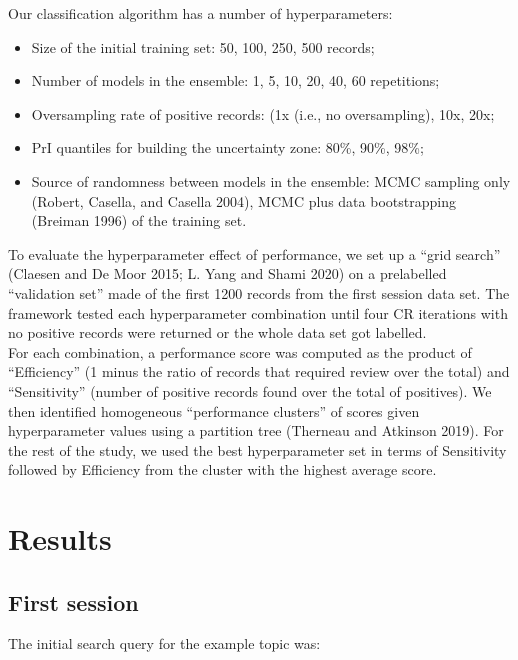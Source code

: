 \documentclass{article}
\begin{document}
Our classification algorithm has a number of hyperparameters:

\begin{itemize}
\tightlist
\item
  Size of the initial training set: 50, 100, 250, 500 records;
\item
  Number of models in the ensemble: 1, 5, 10, 20, 40, 60 repetitions;
\item
  Oversampling rate of positive records: (1x (i.e., no oversampling),
  10x, 20x;
\item
  PrI quantiles for building the uncertainty zone: 80\%, 90\%, 98\%;
\item
  Source of randomness between models in the ensemble: MCMC sampling
  only (Robert, Casella, and Casella 2004), MCMC plus data bootstrapping
  (Breiman 1996) of the training set.
\end{itemize}

To evaluate the hyperparameter effect of performance, we set up a ``grid
search'' (Claesen and De Moor 2015; L. Yang and Shami 2020) on a
prelabelled ``validation set'' made of the first 1200 records from the
first session data set. The framework tested each hyperparameter
combination until four CR iterations with no positive records were
returned or the whole data set got labelled.\\
For each combination, a performance score was computed as the product of
``Efficiency'' (1 minus the ratio of records that required review over
the total) and ``Sensitivity'' (number of positive records found over
the total of positives). We then identified homogeneous ``performance
clusters'' of scores given hyperparameter values using a partition tree
(Therneau and Atkinson 2019). For the rest of the study, we used the
best hyperparameter set in terms of Sensitivity followed by Efficiency
from the cluster with the highest average score.

\hypertarget{results}{%
\section{Results}\label{results}}

\hypertarget{first-session}{%
\subsection{First session}\label{first-session}}

The initial search query for the example topic was:\\
\end{document}
